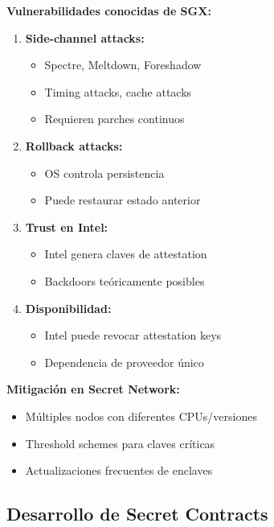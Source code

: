 \documentclass[11pt,a4paper,twoside]{book}
\theoremstyle{definition}
\theoremstyle{remark}
\begin{document}
\begin{advertencia}
\textbf{Vulnerabilidades conocidas de SGX:}

\begin{enumerate}
    \item \textbf{Side-channel attacks:}
    \begin{itemize}
        \item Spectre, Meltdown, Foreshadow
        \item Timing attacks, cache attacks
        \item Requieren parches continuos
    \end{itemize}
    
    \item \textbf{Rollback attacks:}
    \begin{itemize}
        \item OS controla persistencia
        \item Puede restaurar estado anterior
    \end{itemize}
    
    \item \textbf{Trust en Intel:}
    \begin{itemize}
        \item Intel genera claves de attestation
        \item Backdoors teóricamente posibles
    \end{itemize}
    
    \item \textbf{Disponibilidad:}
    \begin{itemize}
        \item Intel puede revocar attestation keys
        \item Dependencia de proveedor único
    \end{itemize}
\end{enumerate}

\textbf{Mitigación en Secret Network:}
\begin{itemize}
    \item Múltiples nodos con diferentes CPUs/versiones
    \item Threshold schemes para claves críticas
    \item Actualizaciones frecuentes de enclaves
\end{itemize}
\end{advertencia}

\subsection{Desarrollo de Secret Contracts}
\end{document}
